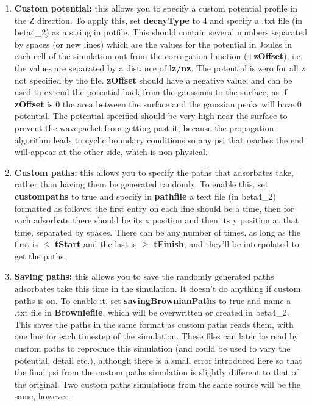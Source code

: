 \documentclass[11pt,letterpaper]{article}
\renewcommand{\\}{\bigskip}
\begin{document}
\begin{enumerate}
    \item \textbf{Custom potential:} this allows you to specify a custom potential profile in the Z direction. To apply this, set \textbf{decayType} to 4 and specify a .txt file (in beta4\_2) as a string in potfile. This should contain several numbers separated by spaces (or new lines) which are the values for the potential in Joules in each cell of the simulation out from the corrugation function (+\textbf{zOffset}), i.e. the values are separated by a distance of \textbf{lz/nz}. The potential is zero for all z not specified by the file. \textbf{zOffset} should have a negative value, and can be used to extend the potential back from the gaussians to the surface, as if \textbf{zOffset} is 0 the area between the surface and the gaussian peaks will have 0 potential. The potential specified should be very high near the surface to prevent the wavepacket from getting past it, because the propagation algorithm leads to cyclic boundary conditions so any psi that reaches the end will appear at the other side, which is non-physical.
    \item \textbf{Custom paths:} this allows you to specify the paths that adsorbates take, rather than having them be generated randomly. To enable this, set \textbf{custompaths} to true and specify in \textbf{pathfile} a text file (in beta4\_2) formatted as follows: the first entry on each line should be a time, then for each adsorbate there should be its x position and then its y position at that time, separated by spaces. There can be any number of times, as long as the first is $\leq$ \textbf{tStart} and the last is $\geq$ \textbf{tFinish}, and they’ll be interpolated to get the paths. 
    \item \textbf{Saving paths:} this allows you to save the randomly generated paths adsorbates take this time in the simulation. It doesn’t do anything if custom paths is on. To enable it, set \textbf{savingBrownianPaths} to true and name a .txt file in \textbf{Browniefile}, which will be overwritten or created in beta4\_2. This saves the paths in the same format as custom paths reads them, with one line for each timestep of the simulation. These files can later be read by custom paths to reproduce this simulation (and could be used to vary the potential, detail etc.), although there is a small error introduced here so that the final psi from the custom paths simulation is slightly different to that of the original. Two custom paths simulations from the same source will be the same, however.
\end{enumerate}
\end{document}

